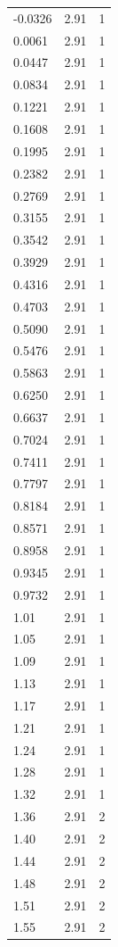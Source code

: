 \begin{longtable}{lrr}
  -0.0326 & 2.91 & 1 \\
  0.0061 & 2.91 & 1 \\
  0.0447 & 2.91 & 1 \\
  0.0834 & 2.91 & 1 \\
  0.1221 & 2.91 & 1 \\
  0.1608 & 2.91 & 1 \\
  0.1995 & 2.91 & 1 \\
  0.2382 & 2.91 & 1 \\
  0.2769 & 2.91 & 1 \\
  0.3155 & 2.91 & 1 \\
  0.3542 & 2.91 & 1 \\
  0.3929 & 2.91 & 1 \\
  0.4316 & 2.91 & 1 \\
  0.4703 & 2.91 & 1 \\
  0.5090 & 2.91 & 1 \\
  0.5476 & 2.91 & 1 \\
  0.5863 & 2.91 & 1 \\
  0.6250 & 2.91 & 1 \\
  0.6637 & 2.91 & 1 \\
  0.7024 & 2.91 & 1 \\
  0.7411 & 2.91 & 1 \\
  0.7797 & 2.91 & 1 \\
  0.8184 & 2.91 & 1 \\
  0.8571 & 2.91 & 1 \\
  0.8958 & 2.91 & 1 \\
  0.9345 & 2.91 & 1 \\
  0.9732 & 2.91 & 1 \\
  1.01 & 2.91 & 1 \\
  1.05 & 2.91 & 1 \\
  1.09 & 2.91 & 1 \\
  1.13 & 2.91 & 1 \\
  1.17 & 2.91 & 1 \\
  1.21 & 2.91 & 1 \\
  1.24 & 2.91 & 1 \\
  1.28 & 2.91 & 1 \\
  1.32 & 2.91 & 1 \\
  1.36 & 2.91 & 2 \\
  1.40 & 2.91 & 2 \\
  1.44 & 2.91 & 2 \\
  1.48 & 2.91 & 2 \\
  1.51 & 2.91 & 2 \\
  1.55 & 2.91 & 2 \\

\end{longtable}
